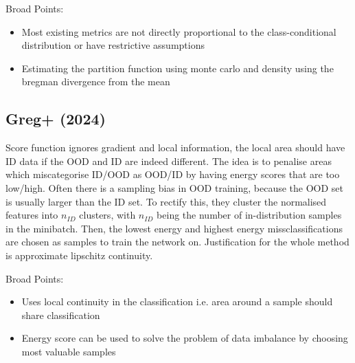 \documentclass{article}
\begin{document}
            Broad Points:
            \begin{itemize}
                \item 
                    Most existing metrics are not directly proportional to the class-conditional distribution or have restrictive assumptions
                \item 
                    Estimating the partition function using monte carlo and density using the bregman divergence from the mean
            \end{itemize}
        \subsection{Greg+ (2024)}
            Score function ignores gradient and local information, the local area should have ID data if the OOD and ID are indeed different. The idea is to penalise areas which miscategorise ID/OOD as OOD/ID by having energy scores that are too low/high. 
            Often there is a sampling bias in OOD training, because the OOD set is usually larger than the ID set. To rectify this, they cluster the normalised features into $n_{ID}$ clusters, with $n_{ID}$ being the number of in-distribution samples in the minibatch. Then, the lowest energy and highest energy missclassifications are chosen as samples to train the network on. Justification for the whole method is approximate lipschitz continuity. 
            
            Broad Points:
            \begin{itemize}
                \item 
                    Uses local continuity in the classification i.e. area around a sample should share classification
                \item 
                    Energy score can be used to solve the problem of data imbalance by choosing most valuable samples
            \end{itemize}
\end{document}
